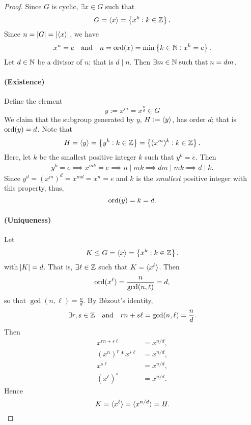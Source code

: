 \documentclass[11pt,openany]{article}
\begin{document}
\begin{proof}
	Since $G$ is cyclic, $\exists x\in G$ such that \[
	G=\langle x \rangle=\set[1]{x^k:k\in\mathbb{Z}}.
	\] Since $n=\abs[0]{G}=\abs[0]{\langle x \rangle}$, we have \[
	x^n=e\quad\text{and}\quad n=\operatorname*{ord}(x)=\min\set[1]{k\in\mathbb{N}:x^k=e}.
	\] Let $d\in\mathbb{N}$ be a divisor of $n$; that is $d\mid n$. Then $\exists m\in\mathbb{N}\;\text{such that}\; n=dm$.
	\paragraph{(Existence)} Define the element \[
	y:=x^{m}=x^{\frac{n}{d}}\in G
	\] We claim that the subgroup generated by $y$, $H:=\langle y \rangle$, has order $d$; that is $\operatorname*{ord}(y)=d$. Note that \[
	H=\langle y \rangle=\set[1]{y^k:k\in\mathbb{Z}}=\set[1]{(x^{m})^k:k\in\mathbb{Z}}.
	\] Here, let $k$ be the smallest positive integer $k$ such that $y^k=e$. Then \begin{align*}
		y^k=e \implies x^{mk}=e
		\implies n\mid mk
		\implies dm\mid mk
		\implies d\mid k.
	\end{align*} Since $y^d=(x^m)^{d}=x^{md}=x^n=e$ and $k$ is the \emph{smallest} positive integer with this property, thus, \[
	\operatorname*{ord}(y)=k=d.
	\]
	\paragraph{(Uniqueness)} Let \[
	K\leq G=\langle x \rangle=\set[1]{x^k:k\in\mathbb{Z}}.
	\] with $\abs{K}=d$. That is, $\exists \ell\in\mathbb{Z}$ such that $K=\langle x^\ell \rangle$. Then \[
	\operatorname*{ord}(x^\ell)=\frac{n}{\gcd(n,\ell)}=d,
	\] so that $\displaystyle\gcd(n,\ell)=\frac{n}{d}$. By Bézout’s identity, \[
	\exists r,s\in\mathbb{Z}\quad\text{and}\quad rn+s\ell=\gcd(n,\ell)=\frac{n}{d}.
	\] Then \begin{align*}
		x^{rn+s\ell}&=x^{n/d}, \\
		(x^{n})^r\ast x^{s\ell}&=x^{n/d},\\
		x^{s\ell}&=x^{n/d},\\
		(x^{\ell})^s&=x^{n/d}.
	\end{align*} Hence \[
	K=\langle x^\ell \rangle=\langle x^{n/d} \rangle=H.
	\]
	
\end{proof}

\end{document}
